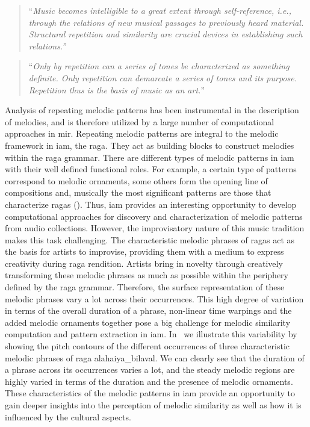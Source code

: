 \blockcquote[]{Cambouropoulos2006}{``\textit{Music becomes intelligible to a great extent through self-reference, i.e., through the relations of new musical passages to previously heard material. Structural repetition and similarity are crucial devices in establishing such relations.''}}

\blockcquote[]{schenker1980harmony}{``\textit{Only by repetition can a series of tones be characterized as something definite. Only repetition can demarcate a series of tones and its purpose. Repetition thus is the basis of music as an art.}''}

Analysis of repeating melodic patterns has been instrumental in the description of melodies, and is therefore utilized by a large number of computational approaches in \gls{mir}. Repeating melodic patterns are integral to the melodic framework in \gls{iam}, the \gls{raga}. They act as building blocks to construct melodies within the \gls{raga} grammar. There are different types of melodic patterns in \gls{iam} with their well defined functional roles. For example, a certain type of patterns correspond to melodic ornaments, some others form the opening line of compositions and, musically the most significant patterns are those that characterize \glspl{raga} (). Thus, \gls{iam} provides an interesting opportunity to develop computational approaches for discovery and characterization of melodic patterns from audio collections. However, the improvisatory nature of this music tradition makes this task challenging. The characteristic melodic phrases of \glspl{raga} act as the basis for artists to improvise, providing them with a medium to express creativity during \gls{raga} rendition. Artists bring in novelty through creatively transforming these melodic phrases as much as possible within the periphery defined by the \gls{raga} grammar. Therefore, the surface representation of these melodic phrases vary a lot across their occurrences. This high degree of variation in terms of the overall duration of a phrase, non-linear time warpings and the added melodic ornaments together pose a big challenge for melodic similarity computation and pattern extraction in \gls{iam}. In~ we illustrate this variability by showing the pitch contours of the different occurrences of three characteristic melodic phrases of \gls{raga} \gls{alahaiya_bilaval}. We can clearly see that the duration of a phrase across its occurrences varies a lot, and the steady melodic regions are highly varied in terms of the duration and the presence of melodic ornaments. These characteristics of the melodic patterns in \gls{iam} provide an opportunity to gain deeper insights into the perception of melodic similarity as well as how it is influenced by the cultural aspects. 

